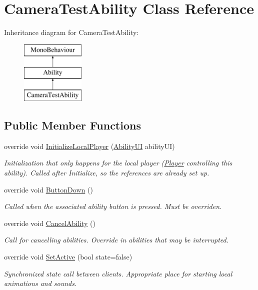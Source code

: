 \hypertarget{class_camera_test_ability}{}\section{Camera\+Test\+Ability Class Reference}
\label{class_camera_test_ability}
Inheritance diagram for Camera\+Test\+Ability\+:\begin{figure}[H]
\begin{center}
\leavevmode
\includegraphics[height=3.000000cm]{class_camera_test_ability}
\end{center}
\end{figure}
\subsection*{Public Member Functions}
\begin{DoxyCompactItemize}
\item 
override void \hyperlink{class_camera_test_ability_ad60de19016609c34f802f6d7eff6b7c8}{Initialize\+Local\+Player} (\hyperlink{class_ability_u_i}{Ability\+UI} ability\+UI)
\begin{DoxyCompactList}\small\item\em Initialization that only happens for the local player (\hyperlink{class_player}{Player} controlling this ability). Called after Initialize, so the references are already set up. \end{DoxyCompactList}\item 
override void \hyperlink{class_camera_test_ability_a27225856d48b83c5b86d2ebdfbd401d1}{Button\+Down} ()
\begin{DoxyCompactList}\small\item\em Called when the associated ability button is pressed. Must be overriden. \end{DoxyCompactList}\item 
override void \hyperlink{class_camera_test_ability_ac3a251d3757f6d45f96668631b26ff7d}{Cancel\+Ability} ()
\begin{DoxyCompactList}\small\item\em Call for cancelling abilities. Override in abilities that may be interrupted. \end{DoxyCompactList}\item 
override void \hyperlink{class_camera_test_ability_ac0e1ec197c4123a84508d5cfb209336c}{Set\+Active} (bool state=false)
\begin{DoxyCompactList}\small\item\em Synchronized state call between clients. Appropriate place for starting local animations and sounds. \end{DoxyCompactList}\end{DoxyCompactItemize}
